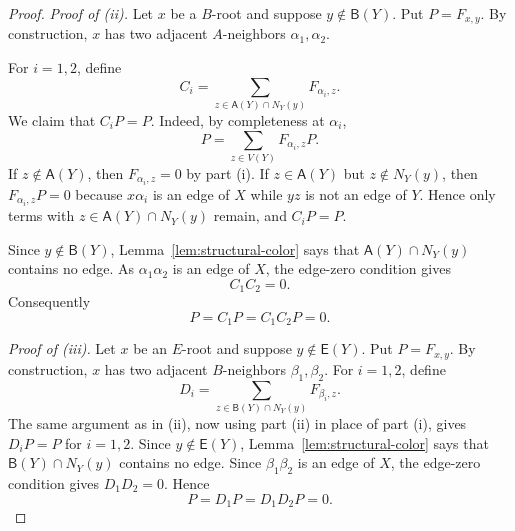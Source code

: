 \documentclass[10pt,a4paper]{amsart}
\newcommand{\Aset}{\mathsf A}
\newcommand{\Bset}{\mathsf B}
\newcommand{\Eset}{\mathsf E}
\begin{document}
\begin{proof}
\smallskip
\noindent\emph{Proof of (ii).}
Let $x$ be a $B$-root and suppose $y\notin \Bset(Y)$.  Put $P=F_{x,y}$.  By construction, $x$ has two adjacent $A$-neighbors $\alpha_1,\alpha_2$.

For $i=1,2$, define
\[
   C_i=\sum_{z\in \Aset(Y)\cap N_Y(y)}F_{\alpha_i,z}.
\]
We claim that $C_iP=P$.  Indeed, by completeness at $\alpha_i$,
\[
   P=\sum_{z\in V(Y)}F_{\alpha_i,z}P.
\]
If $z\notin\Aset(Y)$, then $F_{\alpha_i,z}=0$ by part (i).  If $z\in\Aset(Y)$ but $z\notin N_Y(y)$, then $F_{\alpha_i,z}P=0$ because $x\alpha_i$ is an edge of $X$ while $yz$ is not an edge of $Y$.  Hence only terms with $z\in\Aset(Y)\cap N_Y(y)$ remain, and $C_iP=P$.

Since $y\notin\Bset(Y)$, Lemma~\ref{lem:structural-color} says that $\Aset(Y)\cap N_Y(y)$ contains no edge.  As $\alpha_1\alpha_2$ is an edge of $X$, the edge-zero condition gives
\[
   C_1C_2=0.
\]
Consequently
\[
   P=C_1P=C_1C_2P=0.
\]

\smallskip
\noindent\emph{Proof of (iii).}
Let $x$ be an $E$-root and suppose $y\notin\Eset(Y)$.  Put $P=F_{x,y}$.  By construction, $x$ has two adjacent $B$-neighbors $\beta_1,\beta_2$.  For $i=1,2$, define
\[
   D_i=\sum_{z\in \Bset(Y)\cap N_Y(y)}F_{\beta_i,z}.
\]
The same argument as in (ii), now using part (ii) in place of part (i), gives $D_iP=P$ for $i=1,2$.  Since $y\notin\Eset(Y)$, Lemma~\ref{lem:structural-color} says that $\Bset(Y)\cap N_Y(y)$ contains no edge.  Since $\beta_1\beta_2$ is an edge of $X$, the edge-zero condition gives $D_1D_2=0$.  Hence
\[
   P=D_1P=D_1D_2P=0.
\]
\end{proof}
\end{document}

